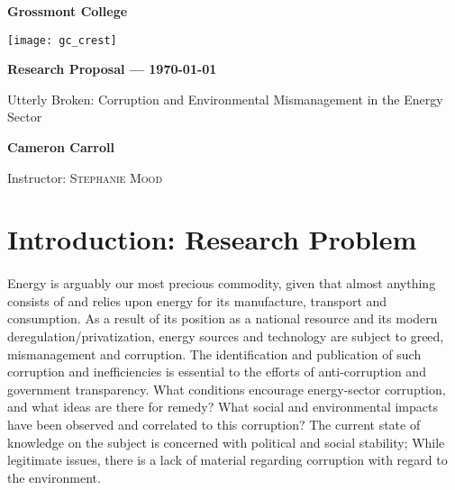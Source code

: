\documentclass[11pt]{article}
\begin{document}
\thispagestyle{empty}
\begin{spacing}{1.5}
\begin{center}
{\Large \bfseries
Grossmont College}

\vspace*{10mm}

\texttt{[image: gc\_crest]}

\vspace*{15mm}
{\large \bfseries Research Proposal --- \today
}

\vspace*{10mm}



\LARGE Utterly Broken: Corruption and Environmental Mismanagement in the Energy Sector


\vspace*{20mm}

{\large \bfseries Cameron Carroll
}

\vspace*{20mm}

Instructor: \textsc{Stephanie Mood}

\end{center}
\end{spacing}

\newpage
\setcounter{page}{1}

\section*{Introduction: Research Problem}
\paragraph*{} Energy is arguably our most precious commodity, given that almost anything consists of and relies upon energy for its manufacture, transport and consumption. As a result of its position as a national resource and its modern deregulation/privatization, energy sources and technology are subject to greed, mismanagement and corruption. The identification and publication of such corruption and inefficiencies is essential to the efforts of anti-corruption and government transparency. What conditions encourage energy-sector corruption, and what ideas are there for remedy? What social and environmental impacts have been observed and correlated to this corruption? The current state of knowledge on the subject is concerned with political and social stability; While legitimate issues, there is a lack of material regarding corruption with regard to the environment.
\end{document}
